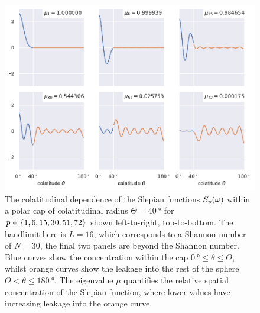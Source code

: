 \begin{figure}[htpb]
	\centering\capstart{}
	\includegraphics[width=\textwidth]{slepian_colatitude.pdf}
	\caption[
		The colatitudinal dependence of the polar cap Slepian functions
	]{
		The colatitudinal dependence of the Slepian functions \({S}_{p}(\omega)\) within a polar cap of colatitudinal radius \(\Theta=\SI{40}{\degree}\) for \(p \in \{1, 6, 15, 30, 51, 72\}\) shown left-to-right, top-to-bottom.
		The bandlimit here is  \(L=16\), which corresponds to a Shannon number of \(N=30\), \ie{} the final two panels are beyond the Shannon number.
		Blue curves show the concentration within the cap \(\SI{0}{\degree} \leq \theta \leq \Theta{}\), whilst orange curves show the leakage into the rest of the sphere \(\Theta < \theta \leq \SI{180}{\degree}\).
		The eigenvalue \(\mu{}\) quantifies the relative spatial concentration of the Slepian function, where lower values have increasing leakage into the orange curve.
	}\label{fig:chapter2_slepian_colatitude}
\end{figure}
